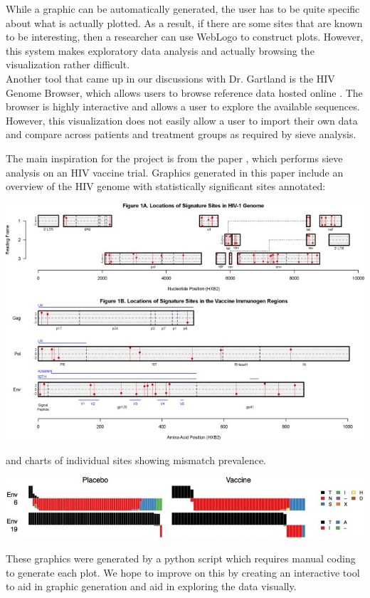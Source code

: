 \documentclass{article}
\begin{document}
While a graphic can be automatically generated, the user has to be quite specific about what is actually plotted.  As a result, if there are some sites that are known to be interesting, then a researcher can use WebLogo to construct plots.  However, this system makes exploratory data analysis and actually browsing the visualization rather difficult.
\\
\newline
\noindent Another tool that came up in our discussions with Dr. Gartland is the HIV Genome Browser, which allows users to browse reference data hosted online \cite{hivgenomebrowser}.   The browser is highly interactive and allows a user to explore the available sequences.   However, this visualization does not easily allow a user to import their own data and compare across patients and treatment groups as required by sieve analysis.  

The main inspiration for the project is from the paper \cite{edlefsen2014comprehensive}, which performs sieve analysis on an HIV vaccine trial. Graphics generated in this paper include an overview of the HIV genome with statistically significant sites annotated:
\begin{center}
	\includegraphics[width=7in]{fig2}
\end{center}
and charts of individual sites showing mismatch prevalence.
\begin{center}
	\includegraphics[width=7in]{fig3}
\end{center}
These graphics were generated by a python script which requires manual coding to generate each plot. We hope to improve on this by creating an interactive tool to aid in graphic generation and aid in exploring the data visually.
\end{document}
